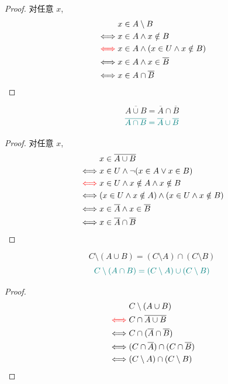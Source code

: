 \begin{proof}
  对任意 $x$,
  \setcounter{equation}{0}
  \begin{align*}
    &x \in A \setminus B \\
    \iff & x \in A \land x \notin B \\
    \textcolor{red}{\iff} & x \in A \land (x \in U \land x \notin B) \\
    \iff & x \in A \land x \in \overline{B} \\
    \iff & x \in A \cap \overline{B}
  \end{align*}
\end{proof}

\begin{theorem}

  \[
    \overline{A \cup B} = \overline{A} \cap \overline{B}
  \]
  \[
    \textcolor{teal}{\overline{A \cap B} = \overline{A} \cup \overline{B}}
  \]
\end{theorem}
\begin{proof}
    对任意 $x$, 
  \setcounter{equation}{0}
  \begin{align*}
    &x \in \overline{A \cup B} \\
    \iff & x \in U \land \lnot (x \in A \lor x \in B) \\
    \textcolor{red}{\iff} & x \in U \land x \notin A \land x \notin B \\
    \iff & (x \in U \land x \notin A) \land (x \in U \land x \notin B) \\
    \iff & x \in \overline{A} \land x \in \overline{B} \\
    \iff & x \in \overline{A} \cap \overline{B}
  \end{align*}
\end{proof}

\begin{theorem}
  \[
    C \setminus (A \cup B) = (C \setminus A) \cap (C \setminus B)
  \]
  \[
    \textcolor{teal}{C \setminus (A \cap B) = (C \setminus A) \cup (C \setminus B)}
  \]
\end{theorem}

\begin{proof}
  \setcounter{equation}{0}
  \begin{align*}
    &C \setminus (A \cup B) \\
    \textcolor{red}{\iff} & C \cap \overline{A \cup B} \\
    \iff & C \cap (\overline{A} \cap \overline{B}) \\
    \iff & (C \cap \overline{A}) \cap (C \cap \overline{B}) \\
    \iff & (C \setminus A) \cap (C \setminus B)
  \end{align*}
\end{proof}

